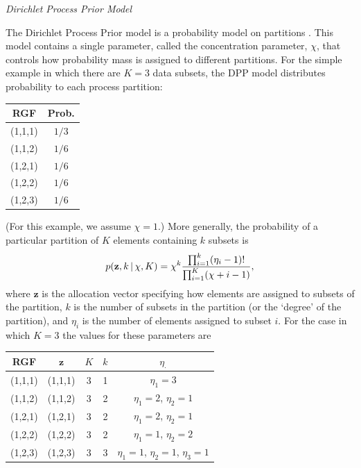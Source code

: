 \documentclass[11pt]{article}
\newcommand{\given}{\ensuremath{\,|\,}}
\begin{document}
\bigskip

\begin{center}
{\it Dirichlet Process Prior Model}
\end{center}

The Dirichlet Process Prior model is a probability model on partitions \citep{ferguson73,antoniak74}.
This model contains a single parameter, called the concentration parameter, $\chi$, that controls how probability mass is assigned to different partitions.
For the simple example in which there are $K=3$ data subsets, the DPP model distributes probability to each process partition:
\begin{center}
\begin{tabular}{cc}
RGF     & Prob. \\ \hline
(1,1,1) & $1/3$ \\
(1,1,2) & $1/6$ \\
(1,2,1) & $1/6$ \\
(1,2,2) & $1/6$ \\
(1,2,3) & $1/6$ \\
\end{tabular}
\end{center}
(For this example, we assume $\chi = 1$.)
More generally, the probability of a particular partition of $K$ elements containing $k$ subsets is
\begin{align}
p({\mathbf z}, k \given \chi, K) = \chi^k { \prod_{i=1}^k(\eta_i - 1)! \over \prod_{i=1}^K (\chi + i -1) },
\end{align}
where ${\mathbf z}$ is the allocation vector specifying how elements are assigned to subsets of the partition, $k$ is the number of subsets in the partition (or the `degree' of the partition), and $\eta_i$ is the number of elements assigned to subset $i$. For the case in which $K=3$ the values for these parameters are
\begin{center}
\begin{tabular}{ccccc}
RGF     & ${\mathbf z}$ & $K$ & $k$ & $\eta_{\cdot}$ \\ \hline
(1,1,1) & (1,1,1) & 3 & 1 & $\eta_1=3$ \\
(1,1,2) & (1,1,2) & 3 & 2 & $\eta_1=2$, $\eta_2=1$ \\
(1,2,1) & (1,2,1) & 3 & 2 & $\eta_1=2$, $\eta_2=1$ \\
(1,2,2) & (1,2,2) & 3 & 2 & $\eta_1=1$, $\eta_2=2$ \\
(1,2,3) & (1,2,3) & 3 & 3 & $\eta_1=1$, $\eta_2=1$, $\eta_3=1$ \\
\end{tabular}
\end{center}
\end{document}
